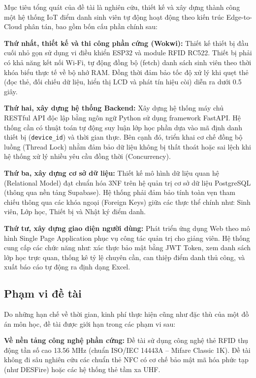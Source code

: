 \documentclass[12pt,a4paper]{report}
\begin{document}
Mục tiêu tổng quát của đề tài là nghiên cứu, thiết kế và xây dựng thành công một hệ thống IoT điểm danh sinh viên tự động hoạt động theo kiến trúc Edge-to-Cloud phân tán, bao gồm bốn cấu phần chính sau:

\textbf{Thứ nhất, thiết kế và thi công phần cứng (Wokwi):}  
Thiết kế thiết bị đầu cuối nhỏ gọn sử dụng vi điều khiển ESP32 và module RFID RC522. Thiết bị phải có khả năng kết nối Wi-Fi, tự động đồng bộ (fetch) danh sách sinh viên theo thời khóa biểu thực tế về bộ nhớ RAM. Đồng thời đảm bảo tốc độ xử lý khi quẹt thẻ (đọc thẻ, đối chiếu dữ liệu, hiển thị LCD và phát tín hiệu còi) diễn ra dưới 0.5 giây.

\textbf{Thứ hai, xây dựng hệ thống Backend:}  
Xây dựng hệ thống máy chủ RESTful API độc lập bằng ngôn ngữ Python sử dụng framework FastAPI. Hệ thống cần có thuật toán tự động suy luận lớp học phần dựa vào mã định danh thiết bị (\texttt{device\_id}) và thời gian thực. Bên cạnh đó, triển khai cơ chế đồng bộ luồng (Thread Lock) nhằm đảm bảo dữ liệu không bị thất thoát hoặc sai lệch khi hệ thống xử lý nhiều yêu cầu đồng thời (Concurrency).

\textbf{Thứ ba, xây dựng cơ sở dữ liệu:}  
Thiết kế mô hình dữ liệu quan hệ (Relational Model) đạt chuẩn hóa 3NF trên hệ quản trị cơ sở dữ liệu PostgreSQL (thông qua nền tảng Supabase). Hệ thống phải đảm bảo tính toàn vẹn tham chiếu thông qua các khóa ngoại (Foreign Keys) giữa các thực thể chính như: Sinh viên, Lớp học, Thiết bị và Nhật ký điểm danh.

\textbf{Thứ tư, xây dựng giao diện người dùng:}  
Phát triển ứng dụng Web theo mô hình Single Page Application phục vụ công tác quản trị cho giảng viên. Hệ thống cung cấp các chức năng như: xác thực bảo mật bằng JWT Token, xem danh sách lớp học trực quan, thống kê tỷ lệ chuyên cần, can thiệp điểm danh thủ công, và xuất báo cáo tự động ra định dạng Excel.

\subsection{Phạm vi đề tài}

Do những hạn chế về thời gian, kinh phí thực hiện cũng như đặc thù của một đồ án môn học, đề tài được giới hạn trong các phạm vi sau:

\textbf{Về nền tảng công nghệ phần cứng:}  
Đề tài sử dụng công nghệ thẻ RFID thụ động tần số cao 13.56 MHz (chuẩn ISO/IEC 14443A -- Mifare Classic 1K). Đề tài không đi sâu nghiên cứu các chuẩn thẻ NFC có cơ chế bảo mật mã hóa phức tạp (như DESFire) hoặc các hệ thống thẻ tầm xa UHF.
\end{document}
